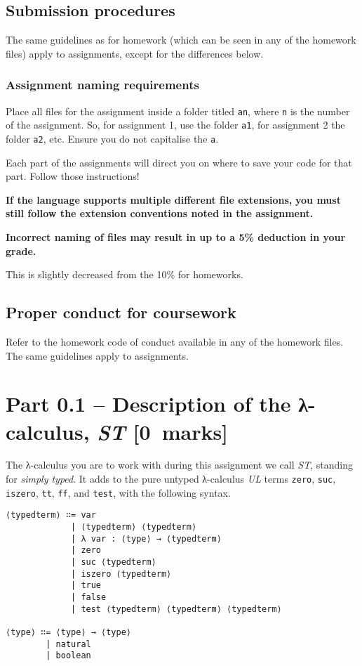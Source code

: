 \documentclass[11pt]{article}
\begin{document}
\subsection*{Submission procedures}
\label{sec:orge1cf179}
The same guidelines as for homework
(which can be seen in any of the homework files)
apply to assignments, except for the differences below.

\subsubsection*{Assignment naming requirements}
\label{sec:orgf3efd8c}

Place all files for the assignment
inside a folder titled \texttt{an}, where \texttt{n} is the number of the assignment.
So, for assignment 1, use the folder \texttt{a1}, for assignment 2 the folder \texttt{a2}, etc.
Ensure you do not capitalise the \texttt{a}.

Each part of the assignments will direct you on where to
save your code for that part. Follow those instructions!

\begin{center}
\textbf{If the language supports multiple different file extensions,}
\textbf{you must still follow the extension conventions noted in the assignment.}
\end{center}

\begin{center}
\textbf{Incorrect naming of files may result in up to a 5\% deduction in your grade.}
\end{center}
This is slightly decreased from the 10\% for homeworks.

\subsection*{Proper conduct for coursework}
\label{sec:orgb2b0c1b}
Refer to the homework code of conduct available in any of the homework files.
The same guidelines apply to assignments.

\section*{Part 0.1 – Description of the λ-calculus, \emph{ST}                 [0 marks]}
\label{sec:org85adb71}
The λ-calculus you are to work with during this assignment
we call \emph{ST}, standing for \emph{simply typed}.
It adds to the pure untyped λ-calculus \emph{UL}
terms \texttt{zero}, \texttt{suc}, \texttt{iszero}, \texttt{tt}, \texttt{ff}, and \texttt{test}, with the following syntax.
\begin{verbatim}
⟨typedterm⟩ ∷= var
             | ⟨typedterm⟩ ⟨typedterm⟩
             | λ var : ⟨type⟩ → ⟨typedterm⟩
             | zero
             | suc ⟨typedterm⟩
             | iszero ⟨typedterm⟩
             | true
             | false
             | test ⟨typedterm⟩ ⟨typedterm⟩ ⟨typedterm⟩

⟨type⟩ ∷= ⟨type⟩ → ⟨type⟩
        | natural
        | boolean
\end{verbatim}
\end{document}
